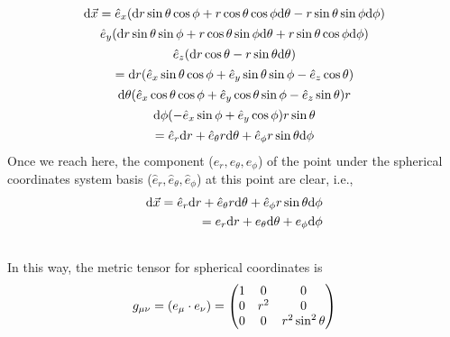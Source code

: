 \documentclass[letterpaper,10pt,english]{sphinxmanual}
\begin{document}
\begin{gather}
\begin{split}\mathrm d\vec x =  \hat e_x (\mathrm dr \sin\theta\cos\phi+r\cos\theta\cos\phi\mathrm d\theta-r\sin\theta\sin\phi\mathrm d\phi)\end{split}\notag\\\begin{split}\hat e_y (\mathrm dr\sin\theta\sin\phi+r\cos\theta\sin\phi\mathrm d\theta+r\sin\theta\cos\phi\mathrm d\phi)\end{split}\notag\\\begin{split}\hat e_z (\mathrm dr\cos\theta-r\sin\theta\mathrm d\theta)\end{split}\notag\\\begin{split} = \mathrm dr(\hat e_x\sin\theta\cos\phi +\hat e_y \sin\theta\sin\phi -\hat e_z \cos\theta)\end{split}\notag\\\begin{split}\mathrm d\theta (\hat e_x\cos\theta\cos\phi +\hat e_y \cos\theta\sin\phi - \hat e_z \sin\theta)r\end{split}\notag\\\begin{split}\mathrm d\phi (-\hat e_x\sin\phi +\hat e_y \cos\phi)r\sin\theta\end{split}\notag\\\begin{split}=\hat e_r\mathrm dr+\hat e_\theta r\mathrm d\theta +\hat e_\phi r\sin\theta\mathrm d \phi\end{split}\notag
\end{gather}
Once we reach here, the component ($e_r ,e_\theta, e_\phi$) of the point under the spherical coordinates system basis ($\hat e_r, \hat e_\theta, \hat e_\phi$) at this point are clear, i.e.,
\begin{gather}
\begin{split}\mathrm d\vec x = \hat e_r\mathrm d r+\hat e_\theta r\mathrm d \theta+\hat e_\phi r\sin\theta \mathrm d\phi \\
 = e_r\mathrm d r+e_\theta \mathrm d\theta+e_\phi \mathrm d\phi\end{split}\notag\\\begin{split}\end{split}\notag
\end{gather}
In this way, the metric tensor for spherical coordinates is
\begin{gather}
\begin{split}g_{\mu\nu}=(e_\mu\cdot e_\nu) = \begin{pmatrix}
1 & 0 & 0 \\
0 & r^2 &  0 \\
0 & 0 & r^2 \sin^2\theta \end{pmatrix}\end{split}\notag\\\begin{split}\end{split}\notag
\end{gather}
\end{document}

